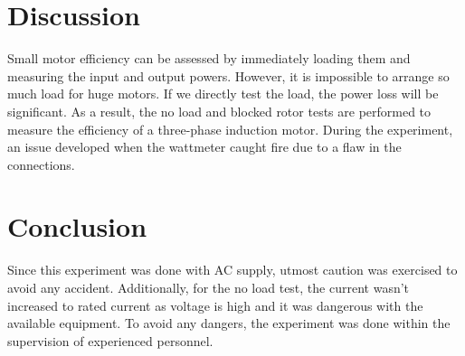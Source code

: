 \documentclass[12pt]{article}
\begin{document}
\section{Discussion}
Small motor efficiency can be assessed by immediately loading them and measuring the input and output powers. However, it is impossible to arrange so much load for huge motors. If we directly test the load, the power loss will be significant. As a result, the no load and blocked rotor tests are performed to measure the efficiency of a three-phase induction motor. During the experiment, an issue developed when the wattmeter caught fire due to a flaw in the connections.


\section{Conclusion}
Since this experiment was done with AC supply, utmost caution was exercised to avoid any accident. Additionally, for the no load test, the current wasn't increased to rated current as voltage is high and it was dangerous with the available equipment. To avoid any dangers, the experiment was done within the supervision of experienced personnel.



\end{document}
